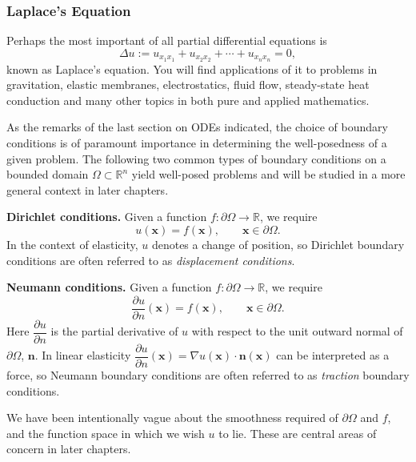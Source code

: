 \subsubsection{Laplace's Equation}\label{subsec:laplace-equation}

Perhaps the most important of all partial differential equations is
\begin{equation}\label{eq:laplace-general}
\Delta u:=u_{x_1x_1}+u_{x_2x_2}+\cdots+u_{x_nx_n}=0,
\end{equation}
known as Laplace's equation. You will find applications of it to problems in gravitation, elastic membranes, electrostatics, fluid flow, steady-state heat conduction and many other topics in both pure and applied mathematics.

As the remarks of the last section on ODEs indicated, the choice of boundary conditions is of paramount importance in determining the well-posedness of a given problem. The following two common types of boundary conditions on a bounded domain $\Omega\subset\mathbb{R}^n$ yield well-posed problems and will be studied in a more general context in later chapters.

\textbf{Dirichlet conditions.} Given a function $f:\partial\Omega\to\mathbb{R}$, we require
\begin{equation}\label{eq:dirichlet-boundary-data}
u(\bm{x})=f(\bm{x}),\qquad\bm{x}\in\partial\Omega.
\end{equation}
In the context of elasticity, $u$ denotes a change of position, so Dirichlet boundary conditions are often referred to as \emph{displacement conditions}.

\textbf{Neumann conditions.} Given a function $f:\partial\Omega\to\mathbb{R}$, we require
\begin{equation}\label{eq:neumann-boundary-data}
\dfrac{\partial u}{\partial n}(\bm{x})=f(\bm{x}),\qquad\bm{x}\in\partial\Omega.
\end{equation}
Here $\dfrac{\partial u}{\partial n}$ is the partial derivative of $u$ with respect to the unit outward normal of $\partial\Omega$, $\bm{n}$. In linear elasticity $\dfrac{\partial u}{\partial n}(\bm{x})=\nabla u(\bm{x})\cdot\bm{n}(\bm{x})$ can be interpreted as a force, so Neumann boundary conditions are often referred to as \emph{traction} boundary conditions.

We have been intentionally vague about the smoothness required of $\partial\Omega$ and $f$, and the function space in which we wish $u$ to lie. These are central areas of concern in later chapters.

